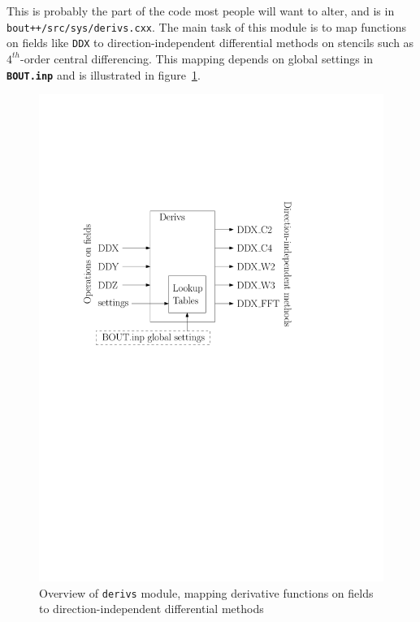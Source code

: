 \documentclass[12pt]{article}
\newcommand{\code}[1]{\texttt{#1}}
\newcommand{\file}[1]{\texttt{\bf #1}}
\begin{document}
This is probably the part of the code most people will want to alter, and is
in \texttt{bout++/src/sys/derivs.cxx}. The main
task of this module is to map functions on fields like \code{DDX}
to direction-independent differential methods on stencils such as
$4^{th}$-order central differencing. This mapping depends on global
settings in \file{BOUT.inp} and is illustrated in figure~\ref{fig:diffOverview}.
\begin{figure}[htb!]
\centering
\includegraphics[scale=0.75]{figs/diffOverview.pdf}
\caption{Overview of \code{derivs} module, mapping derivative functions on fields to direction-independent differential methods}
\label{fig:diffOverview}
\end{figure}
\end{document}
